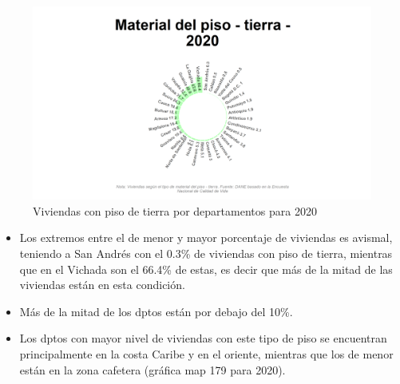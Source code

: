     \begin{figure}[H]
        \caption{Viviendas con piso de tierra por departamentos para 2020 \label{map_result_2} }
        \begin{center}
        \includegraphics[width=\textwidth,keepaspectratio]{img/var_179_static.png}
        \end{center}
    \end{figure}
            \begin{itemize}
                    \item Los extremos entre el de menor y mayor porcentaje de viviendas es avismal, teniendo a San Andrés con el 0.3\% de viviendas con piso de tierra, mientras que en el Vichada son el 66.4\% de estas, es decir que más de la mitad de las viviendas están en esta condición.
                    \item Más de la mitad de los dptos están por debajo del 10\%.
                    \item Los dptos con mayor nivel de viviendas con este tipo de piso se encuentran principalmente en la costa Caribe y en el oriente, mientras que los de menor están en la zona cafetera (gráfica map 179 para 2020).
                    \end{itemize}


